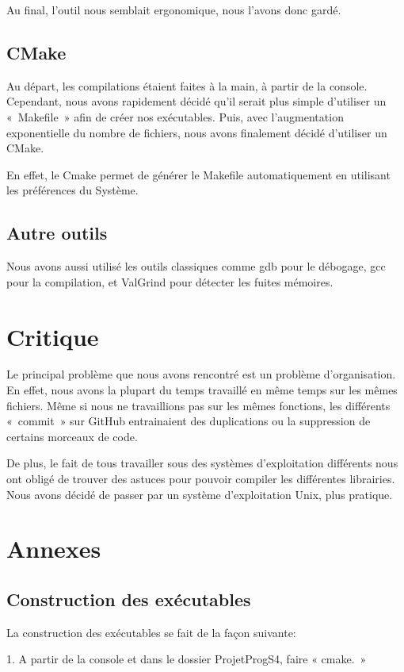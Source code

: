 \documentclass[12pt]{report}
\begin{document}
Au final, l’outil nous semblait ergonomique, nous l’avons donc gardé.

\section{CMake}
Au départ, les compilations étaient faites à la main, à partir de la console. Cependant, nous avons rapidement décidé qu’il serait plus simple d’utiliser un « Makefile » afin de créer nos exécutables. Puis, avec l’augmentation exponentielle du nombre de fichiers, nous avons finalement décidé d’utiliser un CMake.

En effet, le Cmake permet de générer le Makefile automatiquement en utilisant les préférences du Système.

\section{Autre outils}

Nous avons aussi utilisé les outils classiques comme gdb pour le débogage, gcc pour la compilation, et ValGrind pour détecter les fuites mémoires. 

\chapter{Critique}
Le principal problème que nous avons rencontré est un problème d’organisation. En effet, nous avons la plupart du temps travaillé en même temps sur les mêmes fichiers. Même si nous ne travaillions pas sur les mêmes fonctions, les différents « commit » sur GitHub entrainaient des duplications ou la suppression de certains morceaux de code. 

De plus, le fait de tous travailler sous des systèmes d’exploitation différents nous ont obligé de trouver des astuces pour pouvoir compiler les différentes librairies. Nous avons décidé de passer par un système d’exploitation Unix, plus pratique.


\chapter{Annexes}
\section{Construction des exécutables}
La construction des exécutables se fait de la façon suivante:

1. A partir de la console et dans le dossier ProjetProgS4, faire « cmake. »
\end{document}
